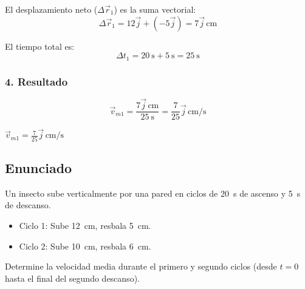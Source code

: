 \documentclass[12pt, a4paper]{article}
\begin{document}
El desplazamiento neto ($\Delta \vec{r}_1$) es la suma vectorial:
\begin{equation}
    \Delta \vec{r}_1 = 12\vec{j} + (-5\vec{j}) = 7\vec{j} \, \si{\centi\metre}
\end{equation}

El tiempo total es:
\begin{equation}
    \Delta t_1 = \SI{20}{\second} + \SI{5}{\second} = \SI{25}{\second}
\end{equation}

\subsubsection*{4. Resultado}
\begin{equation}
    \vec{v}_{m1} = \frac{7\vec{j} \, \si{\centi\metre}}{\SI{25}{\second}} = \frac{7}{25}\vec{j} \, \si{\centi\metre/\second}
\end{equation}

\begin{tcolorbox}[colback=green!5!white, colframe=green!50!black, title=Respuesta Final]
\centering \Large $\vec{v}_{m1} = \frac{7}{25}\vec{j} \, \si{\centi\metre/\second}$
\end{tcolorbox}

\newpage

\subsection*{Enunciado}
Un insecto sube verticalmente por una pared en ciclos de \SI{20}{\second} de ascenso y \SI{5}{\second} de descanso. 
\begin{itemize}
    \item Ciclo 1: Sube \SI{12}{\centi\metre}, resbala \SI{5}{\centi\metre}.
    \item Ciclo 2: Sube \SI{10}{\centi\metre}, resbala \SI{6}{\centi\metre}.
\end{itemize}
Determine la velocidad media durante el primero y segundo ciclos (desde $t=0$ hasta el final del segundo descanso).

\begin{center}
\end{center}
\end{document}
